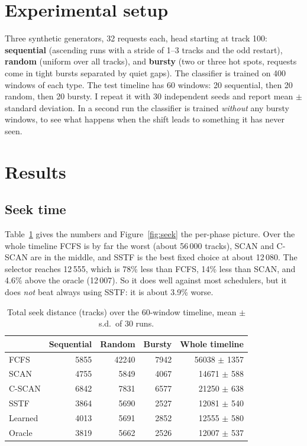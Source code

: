\documentclass[10pt,a4paper]{article}
\begin{document}
\section{Experimental setup}
Three synthetic generators, 32 requests each, head starting at track 100:
\textbf{sequential} (ascending runs with a stride of 1--3 tracks and the odd restart),
\textbf{random} (uniform over all tracks), and \textbf{bursty} (two or three hot spots, requests
come in tight bursts separated by quiet gaps). The classifier is trained on 400 windows of each type.
The test timeline has 60 windows: 20 sequential, then 20 random, then 20 bursty. I repeat it with
30 independent seeds and report mean $\pm$ standard deviation. In a second run the
classifier is trained \emph{without} any bursty windows, to see what happens when the shift
leads to something it has never seen.

\section{Results}\label{sec:res}
\subsection{Seek time}
Table~\ref{tab:seek} gives the numbers and Figure~\ref{fig:seek} the per-phase picture.
Over the whole timeline FCFS is by far the worst (about 56\,000 tracks), SCAN and C-SCAN are in
the middle, and SSTF is the best fixed choice at about 12\,080. The selector reaches
12\,555, which is 78\% less than FCFS, 14\% less than SCAN, and 4.6\% above the oracle (12\,007).
So it does well against most schedulers, but it does \emph{not} beat always using SSTF: it is
about 3.9\% worse.

\begin{table}[H]
\centering\small
\caption{Total seek distance (tracks) over the 60-window timeline, mean $\pm$ s.d.\ of 30 runs.}
\label{tab:seek}
\begin{tabular}{lrrrr}
\toprule
 & Sequential & Random & Bursty & Whole timeline \\
\midrule
FCFS    & 5855 & 42240 & 7942 & 56038 $\pm$ 1357 \\
SCAN    & 4755 & 5849  & 4067 & 14671 $\pm$ 588 \\
C-SCAN  & 6842 & 7831  & 6577 & 21250 $\pm$ 638 \\
SSTF    & 3864 & 5690  & 2527 & 12081 $\pm$ 540 \\
\midrule
Learned & 4013 & 5691  & 2852 & 12555 $\pm$ 580 \\
Oracle  & 3819 & 5662  & 2526 & 12007 $\pm$ 537 \\
\bottomrule
\end{tabular}
\end{table}
\end{document}
